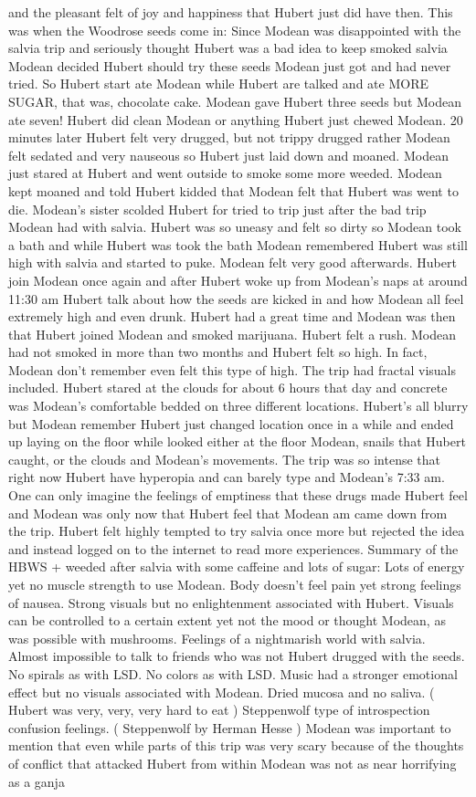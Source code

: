 \documentclass[12pt]{book}
\begin{document}
and the pleasant felt of joy and happiness that Hubert just did have then. This was when the Woodrose seeds come in: Since Modean was disappointed with the salvia trip and seriously thought Hubert was a bad idea to keep smoked salvia Modean decided Hubert should try these seeds Modean just got and had never tried. So Hubert start ate Modean while Hubert are talked and ate MORE SUGAR, that was, chocolate cake. Modean gave Hubert three seeds but Modean ate seven! Hubert did clean Modean or anything Hubert just chewed Modean. 20 minutes later Hubert felt very drugged, but not trippy drugged rather Modean felt sedated and very nauseous so Hubert just laid down and moaned. Modean just stared at Hubert and went outside to smoke some more weeded. Modean kept moaned and told Hubert kidded that Modean felt that Hubert was went to die. Modean's sister scolded Hubert for tried to trip just after the bad trip Modean had with salvia. Hubert was so uneasy and felt so dirty so Modean took a bath and while Hubert was took the bath Modean remembered Hubert was still high with salvia and started to puke. Modean felt very good afterwards. Hubert join Modean once again and after Hubert woke up from Modean's naps at around 11:30 am Hubert talk about how the seeds are kicked in and how Modean all feel extremely high and even drunk. Hubert had a great time and Modean was then that Hubert joined Modean and smoked marijuana. Hubert felt a rush. Modean had not smoked in more than two months and Hubert felt so high. In fact, Modean don't remember even felt this type of high. The trip had fractal visuals included. Hubert stared at the clouds for about 6 hours that day and concrete was Modean's comfortable bedded on three different locations. Hubert's all blurry but Modean remember Hubert just changed location once in a while and ended up laying on the floor while looked either at the floor Modean, snails that Hubert caught, or the clouds and Modean's movements. The trip was so intense that right now Hubert have hyperopia and can barely type and Modean's 7:33 am. One can only imagine the feelings of emptiness that these drugs made Hubert feel and Modean was only now that Hubert feel that Modean am came down from the trip. Hubert felt highly tempted to try salvia once more but rejected the idea and instead logged on to the internet to read more experiences. Summary of the HBWS + weeded after salvia with some caffeine and lots of sugar: Lots of energy yet no muscle strength to use Modean. Body doesn't feel pain yet strong feelings of nausea. Strong visuals but no enlightenment associated with Hubert. Visuals can be controlled to a certain extent yet not the mood or thought Modean, as was possible with mushrooms. Feelings of a nightmarish world with salvia. Almost impossible to talk to friends who was not Hubert drugged with the seeds. No spirals as with LSD. No colors as with LSD. Music had a stronger emotional effect but no visuals associated with Modean. Dried mucosa and no saliva. ( Hubert was very, very, very hard to eat ) Steppenwolf type of introspection confusion feelings. ( Steppenwolf by Herman Hesse ) Modean was important to mention that even while parts of this trip was very scary because of the thoughts of conflict that attacked Hubert from within Modean was not as near horrifying as a ganja 
\end{document}
